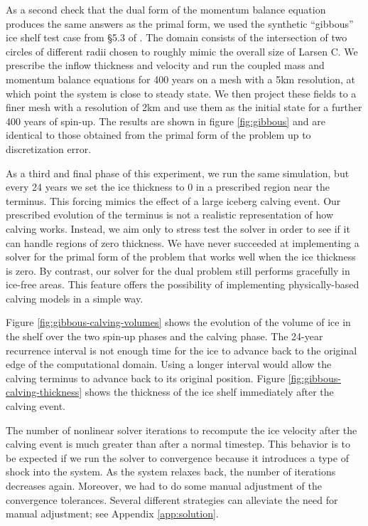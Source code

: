 \documentclass{article}
\theoremstyle{definition}
\theoremstyle{plain}
\begin{document}
As a second check that the dual form of the momentum balance equation produces the same answers as the primal form, we used the synthetic ``gibbous'' ice shelf test case from \S5.3 of \citet{shapero2021icepack}.
The domain consists of the intersection of two circles of different radii chosen to roughly mimic the overall size of Larsen C.
We prescribe the inflow thickness and velocity and run the coupled mass and momentum balance equations for 400 years on a mesh with a 5km resolution, at which point the system is close to steady state.
We then project these fields to a finer mesh with a resolution of 2km and use them as the initial state for a further 400 years of spin-up.
The results are shown in figure \ref{fig:gibbous} and are identical to those obtained from the primal form of the problem up to discretization error.

As a third and final phase of this experiment, we run the same simulation, but every 24 years we set the ice thickness to 0 in a prescribed region near the terminus.
This forcing mimics the effect of a large iceberg calving event.
Our prescribed evolution of the terminus is not a realistic representation of how calving works.
Instead, we aim only to stress test the solver in order to see if it can handle regions of zero thickness.
We have never succeeded at implementing a solver for the primal form of the problem that works well when the ice thickness is zero.
By contrast, our solver for the dual problem still performs gracefully in ice-free areas.
This feature offers the possibility of implementing physically-based calving models in a simple way.

Figure \ref{fig:gibbous-calving-volumes} shows the evolution of the volume of ice in the shelf over the two spin-up phases and the calving phase.
The 24-year recurrence interval is not enough time for the ice to advance back to the original edge of the computational domain.
Using a longer interval would allow the calving terminus to advance back to its original position.
Figure \ref{fig:gibbous-calving-thickness} shows the thickness of the ice shelf immediately after the calving event.

The number of nonlinear solver iterations to recompute the ice velocity after the calving event is much greater than after a normal timestep.
This behavior is to be expected if we run the solver to convergence because it introduces a type of shock into the system.
As the system relaxes back, the number of iterations decreases again.
Moreover, we had to do some manual adjustment of the convergence tolerances.
Several different strategies can alleviate the need for manual adjustment; see Appendix \ref{app:solution}.
\end{document}
